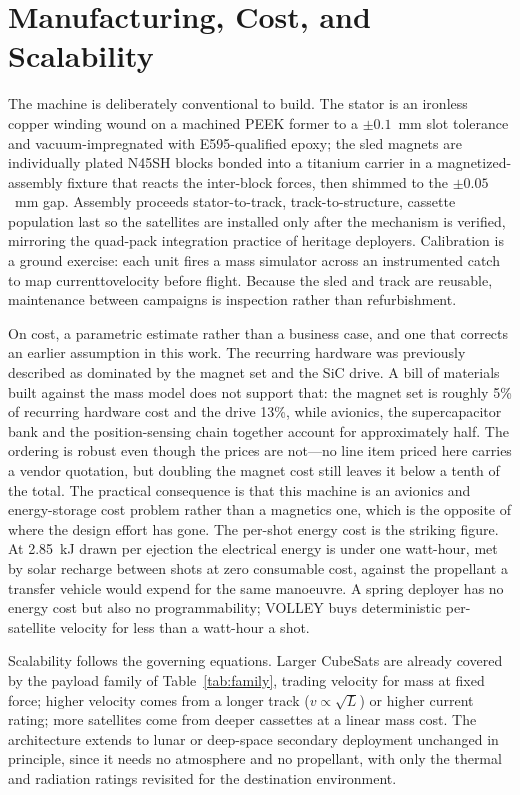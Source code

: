 \documentclass[conference]{IEEEtran}
\begin{document}
\section{Manufacturing, Cost, and Scalability}\label{sec:mfg}
The machine is deliberately conventional to build. The stator is an ironless copper winding wound on a machined PEEK former to a $\pm0.1$~mm slot tolerance and vacuum-impregnated with E595-qualified epoxy; the sled magnets are individually plated N45SH blocks bonded into a titanium carrier in a magnetized-assembly fixture that reacts the inter-block forces, then shimmed to the $\pm0.05$~mm gap. Assembly proceeds stator-to-track, track-to-structure, cassette population last so the satellites are installed only after the mechanism is verified, mirroring the quad-pack integration practice of heritage deployers. Calibration is a ground exercise: each unit fires a mass simulator across an instrumented catch to map current\-to\-velocity before flight. Because the sled and track are reusable, maintenance between campaigns is inspection rather than refurbishment.

On cost, a parametric estimate rather than a business case, and one that corrects an earlier assumption in this work. The recurring hardware was previously described as dominated by the magnet set and the SiC drive. A bill of materials built against the mass model does not support that: the magnet set is roughly 5\% of recurring hardware cost and the drive 13\%, while avionics, the supercapacitor bank and the position-sensing chain together account for approximately half. The ordering is robust even though the prices are not---no line item priced here carries a vendor quotation, but doubling the magnet cost still leaves it below a tenth of the total. The practical consequence is that this machine is an avionics and energy-storage cost problem rather than a magnetics one, which is the opposite of where the design effort has gone. The per-shot energy cost is the striking figure. At 2.85~kJ drawn per ejection the electrical energy is under one watt-hour, met by solar recharge between shots at zero consumable cost, against the propellant a transfer vehicle would expend for the same manoeuvre. A spring deployer has no energy cost but also no programmability; VOLLEY buys deterministic per-satellite velocity for less than a watt-hour a shot.

Scalability follows the governing equations. Larger CubeSats are already covered by the payload family of Table~\ref{tab:family}, trading velocity for mass at fixed force; higher velocity comes from a longer track ($v\propto\sqrt{L}$) or higher current rating; more satellites come from deeper cassettes at a linear mass cost. The architecture extends to lunar or deep-space secondary deployment unchanged in principle, since it needs no atmosphere and no propellant, with only the thermal and radiation ratings revisited for the destination environment.
\end{document}
